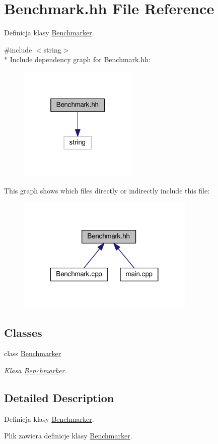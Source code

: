 \hypertarget{a00010}{}\section{Benchmark.\+hh File Reference}
\label{a00010}


Definicja klasy \hyperlink{a00002}{Benchmarker}.  


{\ttfamily \#include $<$string$>$}\\*
Include dependency graph for Benchmark.\+hh\+:\nopagebreak
\begin{figure}[H]
\begin{center}
\leavevmode
\includegraphics[width=160pt]{a00026}
\end{center}
\end{figure}
This graph shows which files directly or indirectly include this file\+:\nopagebreak
\begin{figure}[H]
\begin{center}
\leavevmode
\includegraphics[width=239pt]{a00027}
\end{center}
\end{figure}
\subsection*{Classes}
\begin{DoxyCompactItemize}
\item 
class \hyperlink{a00002}{Benchmarker}
\begin{DoxyCompactList}\small\item\em Klasa \hyperlink{a00002}{Benchmarker}. \end{DoxyCompactList}\end{DoxyCompactItemize}


\subsection{Detailed Description}
Definicja klasy \hyperlink{a00002}{Benchmarker}. 

Plik zawiera definicje klasy \hyperlink{a00002}{Benchmarker}. 